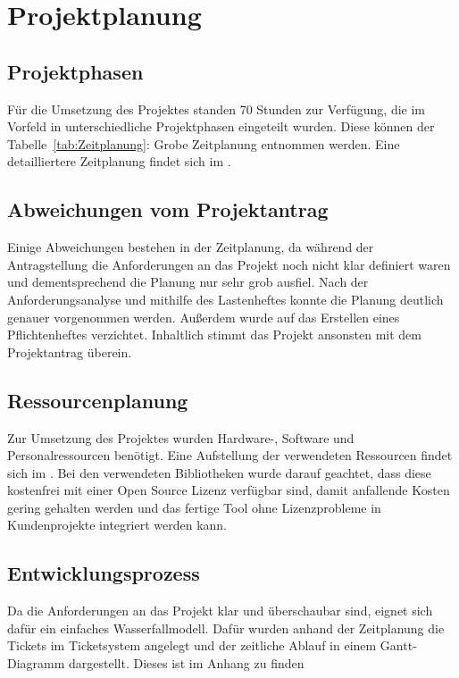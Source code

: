 \section{Projektplanung} 
\label{sec:Projektplanung}


\subsection{Projektphasen}
\label{sec:Projektphasen}
Für die Umsetzung des Projektes standen 70 Stunden zur Verfügung, die im Vorfeld in unterschiedliche Projektphasen eingeteilt wurden. Diese können der Tabelle~\ref{tab:Zeitplanung}: Grobe Zeitplanung entnommen werden. Eine detailliertere Zeitplanung findet sich im . 



\subsection{Abweichungen vom Projektantrag}
\label{sec:AbweichungenProjektantrag}

Einige Abweichungen bestehen in der Zeitplanung, da während der Antragstellung die Anforderungen an das Projekt noch nicht klar definiert waren und dementsprechend die Planung nur sehr grob ausfiel. Nach der Anforderungsanalyse und mithilfe des Lastenheftes konnte die Planung deutlich genauer vorgenommen werden. Außerdem wurde auf das Erstellen eines Pflichtenheftes verzichtet. Inhaltlich stimmt das Projekt ansonsten mit dem Projektantrag überein.


\subsection{Ressourcenplanung}
\label{sec:Ressourcenplanung}

Zur Umsetzung des Projektes wurden Hardware-, Software und Personalressourcen benötigt. Eine Aufstellung der verwendeten Ressourcen findet sich im . Bei den verwendeten Bibliotheken wurde darauf geachtet, dass diese kostenfrei mit einer Open Source Lizenz verfügbar sind, damit anfallende Kosten gering gehalten werden und das fertige Tool ohne Lizenzprobleme in Kundenprojekte integriert werden kann.


\subsection{Entwicklungsprozess}
\label{sec:Entwicklungsprozess}

Da die Anforderungen an das Projekt klar und überschaubar sind, eignet sich dafür ein einfaches Wasserfallmodell. Dafür wurden anhand der Zeitplanung die Tickets im Ticketsystem angelegt und der zeitliche Ablauf in einem Gantt-Diagramm dargestellt. Dieses ist im Anhang zu finden %
